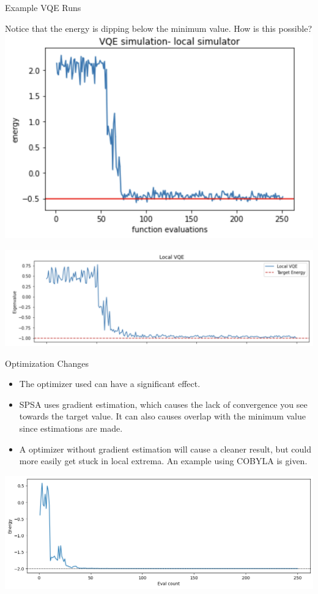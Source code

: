 \begin{frame}{Example VQE Runs}

Notice that the energy is dipping below the minimum value. How is this possible?
\includegraphics[scale = 0.3]{400/VQE_Ex_2.png}



\includegraphics[scale = 0.35]{400/VQE_Ex_1.png}



\end{frame}

\begin{frame}{Optimization Changes}
    \begin{itemize}
        \item The optimizer used can  have a significant effect.
        \item SPSA uses gradient estimation, which causes the lack of convergence you see towards the target value. It can also causes overlap with the minimum value since estimations are made.
        \item A optimizer without gradient estimation will cause a cleaner result, but could more easily get stuck in local extrema. An example using COBYLA is given.
    \end{itemize}

    \includegraphics[scale = 0.35]{400/output.png}

\end{frame}

